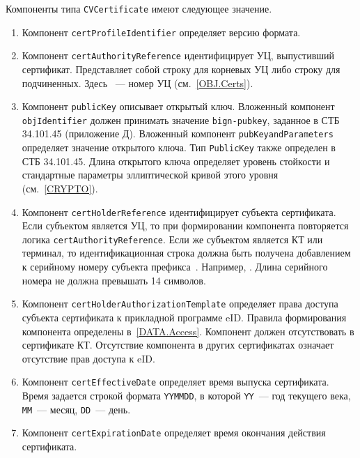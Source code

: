 Компоненты типа \verb|CVCertificate| имеют следующее значение.
\begin{enumerate}
\item
Компонент \verb|certProfileIdentifier| определяет версию формата. 

\item
Компонент \verb|certAuthorityReference| идентифицирует УЦ, выпустивший 
сертификат. Представляет собой строку  для корневых УЦ либо  
строку  для подчиненных. Здесь ~--- 
номер УЦ (см.~\ref{OBJ.Certs}).

\item
Компонент \verb|publicKey| описывает открытый ключ.
Вложенный компонент \verb|objIdentifier| 
должен принимать значение \texttt{bign-pubkey}, 
заданное в СТБ 34.101.45 (приложение Д).
Вложенный компонент \verb|pubKeyandParameters| определяет значение открытого 
ключа. Тип \verb|PublicKey| также определен в СТБ 34.101.45. 
Длина открытого ключа определяет уровень стойкости и стандартные параметры  
эллиптической кривой этого уровня (см.~\ref{CRYPTO}).

\item
Компонент \verb|certHolderReference| идентифицирует субъекта сертификата.
Если субъектом является УЦ, то при формировании компонента повторяется логика 
\verb|certAuthorityReference|. Если же субъектом является КТ или терминал, то 
идентификационная строка должна быть получена добавлением к серийному номеру 
субъекта префикса~. Например, . Длина серийного 
номера не должна превышать 14 символов.  

\item
Компонент \verb|certHolderAuthorizationTemplate| определяет права доступа 
субъекта сертификата к прикладной программе eID. Правила формирования 
компонента определены в~\ref{DATA.Access}.
%
Компонент должен отсутствовать в сертификате КТ.
%
Отсутствие компонента в других сертификатах означает отсутствие прав 
доступа к eID. 

\item
Компонент \verb|certEffectiveDate| определяет время выпуска сертификата.
%
Время задается строкой формата \texttt{YYMMDD}, 
в которой \texttt{YY}~--- год текущего века, 
\texttt{MM}~--- месяц, \texttt{DD}~--- день.

\item
Компонент \verb|certExpirationDate| определяет время окончания действия 
сертификата.


\end{enumerate}
